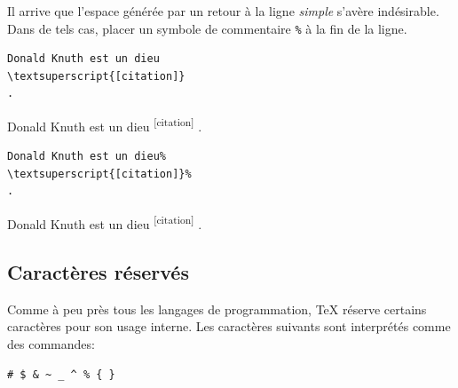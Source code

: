 Il arrive que l'espace générée par un retour à la ligne \emph{simple}
s'avère indésirable. Dans de tels cas, placer un symbole de
commentaire \verb=%= à la fin de la ligne.
\begin{demo}
  \begin{texample}
\begin{lstlisting}
Donald Knuth est un dieu
\textsuperscript{[citation]}
.
\end{lstlisting}
    \producing
    Donald Knuth est un dieu
    \textsuperscript{[citation]}
    .
  \end{texample}
  \begin{texample}
\begin{lstlisting}
Donald Knuth est un dieu%
\textsuperscript{[citation]}%
.
\end{lstlisting}
    \producing
    Donald Knuth est un dieu%
    \textsuperscript{[citation]}%
    .
  \end{texample}
\end{demo}

\subsection{Caractères réservés}
\label{sec:bases:caracteres:reserves}

Comme à peu près tous les langages de programmation, {\TeX} réserve
certains caractères pour son usage interne. Les caractères suivants sont
interprétés comme des commandes:
\begin{center}
  \verb=# $ & ~ _ ^ % { }=
\end{center}

